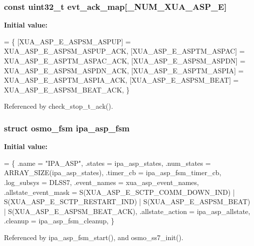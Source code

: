 \subsubsection[{evt\+\_\+ack\+\_\+map}]{\setlength{\rightskip}{0pt plus 5cm}const uint32\+\_\+t evt\+\_\+ack\+\_\+map[{\bf \+\_\+\+N\+U\+M\+\_\+\+X\+U\+A\+\_\+\+A\+S\+P\+\_\+E}]\hspace{0.3cm}{\ttfamily [static]}}\label{xua__asp__fsm_8c_a34912c3b074c85d6db88aad66fbd499f}
{\bfseries Initial value\+:}
\begin{DoxyCode}
= \{
        [XUA_ASP_E_ASPSM_ASPUP] = XUA_ASP_E_ASPSM_ASPUP_ACK,
        [XUA_ASP_E_ASPTM_ASPAC] = XUA_ASP_E_ASPTM_ASPAC_ACK,
        [XUA_ASP_E_ASPSM_ASPDN] = XUA_ASP_E_ASPSM_ASPDN_ACK,
        [XUA_ASP_E_ASPTM_ASPIA] = XUA_ASP_E_ASPTM_ASPIA_ACK,
        [XUA_ASP_E_ASPSM_BEAT] = XUA_ASP_E_ASPSM_BEAT_ACK,
\}
\end{DoxyCode}


Referenced by check\+\_\+stop\+\_\+t\+\_\+ack().

\subsubsection[{ipa\+\_\+asp\+\_\+fsm}]{\setlength{\rightskip}{0pt plus 5cm}struct osmo\+\_\+fsm ipa\+\_\+asp\+\_\+fsm}\label{xua__asp__fsm_8c_a43e75ddbe7932fe493cb59d8248e0c98}
{\bfseries Initial value\+:}
\begin{DoxyCode}
= \{
        .name = \textcolor{stringliteral}{"IPA\_ASP"},
        .states = ipa_asp_states,
        .num\_states = ARRAY\_SIZE(ipa_asp_states),
        .timer\_cb = ipa_asp_fsm_timer_cb,
        .log\_subsys = DLSS7,
        .event\_names = xua_asp_event_names,
        .allstate\_event\_mask = S(XUA_ASP_E_SCTP_COMM_DOWN_IND) |
                               S(XUA_ASP_E_SCTP_RESTART_IND) |
                               S(XUA_ASP_E_ASPSM_BEAT) |
                               S(XUA_ASP_E_ASPSM_BEAT_ACK),
        .allstate\_action = ipa_asp_allstate,
        .cleanup = ipa_asp_fsm_cleanup,
\}
\end{DoxyCode}


Referenced by ipa\+\_\+asp\+\_\+fsm\+\_\+start(), and osmo\+\_\+ss7\+\_\+init().

